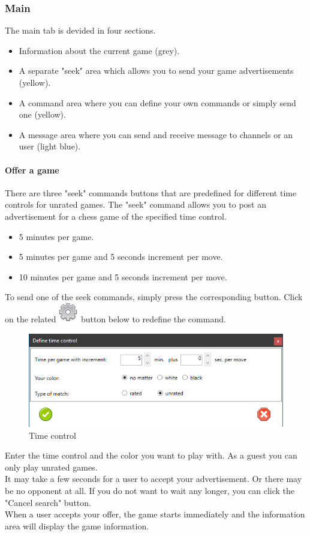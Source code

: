 \documentclass[11pt,a4paper]{article}
\begin{document}
\subsubsection{Main}
The main tab is devided in four sections.
\begin{itemize}
	\item Information about the current game (grey).
    \item A separate "seek" area which allows you to send your game advertisements (yellow).
	\item A command area where you can define your own commands or simply send one (yellow).
	\item A message area where you can send and receive message to channels or an user (light blue).
\end{itemize}

\paragraph{Offer a game}
There are three "seek" commands buttons that are predefined for different time controls for unrated games. The "seek" command allows you to post an advertisement for a chess 
game of the specified time control.

\begin{itemize}
	\item 5 minutes per game.
	\item 5 minutes per game and 5 seconds increment per move.
	\item 10 minutes per game and 5 seconds increment per move.
\end{itemize}
To send one of the seek commands, simply press the corresponding button.
Click on the related \includegraphics[scale=0.3]{cog.png} button below to redefine the command.
\begin{figure}[H]
	\centering
	\includegraphics[scale=1.0]{fics4.png}
	\caption{Time control}
	\label{fig:ficsTimecontrol}
\end{figure}
Enter the time control and the color you want to play with. As a guest you can only play unrated games.\\
It may take a few seconds for a user to accept your advertisement. Or there may be no opponent at all. If you do not want to wait any longer, you can click the "Cancel search" button.\\
When a user accepts your offer, the game starts immediately and the information area will display the game information.
\end{document}
